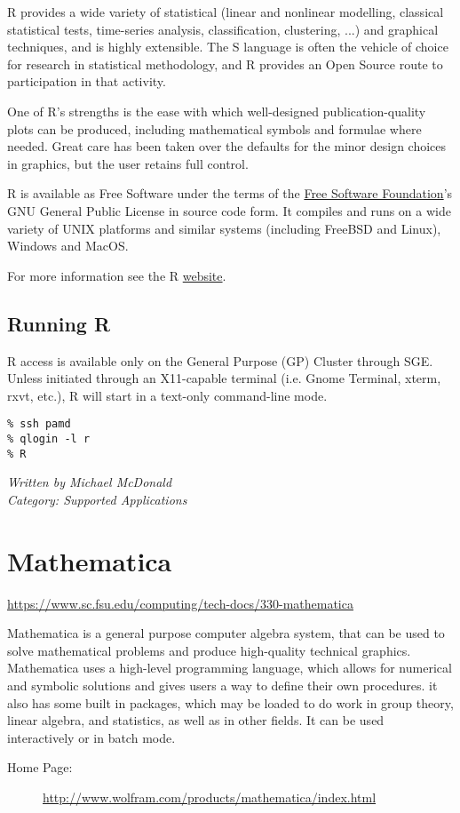 \documentclass[12pt,a4paper]{article}
\begin{document}
R provides a wide variety of statistical (linear and nonlinear
modelling, classical statistical tests, time-series analysis,
classification, clustering, ...) and graphical techniques, and is
highly extensible. The S language is often the vehicle of choice for
research in statistical methodology, and R provides an Open Source
route to participation in that activity.

One of R's strengths is the ease with which well-designed
publication-quality plots can be produced, including mathematical
symbols and formulae where needed. Great care has been taken over the
defaults for the minor design choices in graphics, but the user
retains full control.

R is available as Free Software under the terms of the \href{http://www.fsf.org/}{Free Software Foundation}'s
GNU General Public License in source code
form. It compiles and runs on a wide variety of UNIX platforms and
similar systems (including FreeBSD and Linux), Windows and MacOS.

For more information see the R \href{https://www.r-project.org/}{website}.

\subsection*{Running R}
R access is available only on the General Purpose (GP) Cluster through SGE.
Unless initiated through an X11-capable terminal (i.e. Gnome Terminal, xterm, rxvt, etc.), R will start in a text-only command-line mode.
\begin{verbatim}
% ssh pamd
% qlogin -l r
% R
\end{verbatim}
\hfill \textit{Written by Michael McDonald} \\
\hfill \textit{Category: Supported Applications}

\section{Mathematica}
\url{https://www.sc.fsu.edu/computing/tech-docs/330-mathematica}

Mathematica is a general purpose computer algebra system, that can be used to solve mathematical problems and produce high-quality technical graphics. Mathematica uses a high-level programming language, which allows for numerical and symbolic solutions and gives users a way to define their own procedures. it also has some built in packages, which may be loaded to do work in group theory, linear algebra, and statistics, as well as in other fields. It can be used interactively or in batch mode.
\begin{description}
    \item[Home Page:] \url{http://www.wolfram.com/products/mathematica/index.html}
\end{description}
\end{document}
